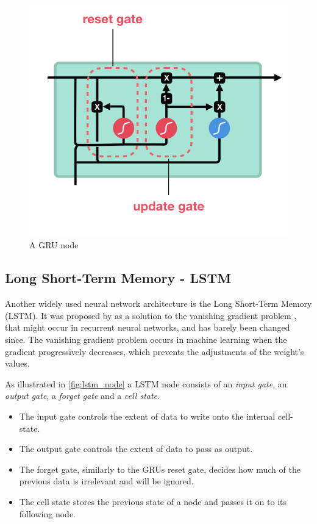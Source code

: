 \documentclass[nofilelist]{cslthse-msc}
\begin{document}
\begin{figure}[h!]
    \centering
    \includegraphics[scale=0.4]{msccls/explanatory_images/gru.png}
    \caption{A GRU node}
    \label{fig:gru_node}
\end{figure}

\subsection{Long Short-Term Memory - LSTM}
Another widely used neural network architecture is the Long Short-Term Memory (LSTM). It was proposed by \citet{hochreiter1997} as a solution to the vanishing gradient problem \citep{hochreiter1998}, that might occur in recurrent neural networks, and has barely been changed since. The vanishing gradient problem occurs in machine learning when the gradient progressively decreases, which prevents the adjustments of the weight's values. 

As illustrated in \ref{fig:lstm_node} a LSTM node consists of an \textit{input gate}, an \textit{output gate}, a \textit{forget gate} and a \textit{cell state}. 
\begin{itemize}
    \item The input gate controls the extent of data to write onto the internal cell-state.
    \item The output gate controls the extent of data to pass as output. 
    \item The forget gate, similarly to the GRUs reset gate, decides how much of the previous data is irrelevant and will be ignored. 
    \item The cell state stores the previous state of a node and passes it on to its following node. 
\end{itemize}
\end{document}
